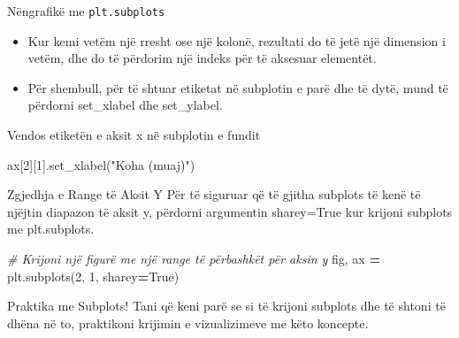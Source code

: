 \documentclass[
  ignorenonframetext,
]{beamer}
\newenvironment{Shaded}{\begin{snugshade}}{\end{snugshade}}
\newcommand{\CommentTok}[1]{\textcolor[rgb]{0.56,0.35,0.01}{\textit{#1}}}
\newcommand{\DecValTok}[1]{\textcolor[rgb]{0.00,0.00,0.81}{#1}}
\newcommand{\NormalTok}[1]{#1}
\newcommand{\OperatorTok}[1]{\textcolor[rgb]{0.81,0.36,0.00}{\textbf{#1}}}
\newcommand{\StringTok}[1]{\textcolor[rgb]{0.31,0.60,0.02}{#1}}
\newcommand{\VariableTok}[1]{\textcolor[rgb]{0.00,0.00,0.00}{#1}}
\begin{document}
\begin{frame}{Nëngrafikë me \texttt{plt.subplots}}
\protect\hypertarget{nuxebngrafikuxeb-me-plt.subplots-3}{}
\begin{itemize}
\item
  Kur kemi vetëm një rresht ose një kolonë, rezultati do të jetë një
  dimension i vetëm, dhe do të përdorim një indeks për të aksesuar
  elementët.
\item
  Për shembull, për të shtuar etiketat në subplotin e parë dhe të dytë,
  mund të përdorni set\_xlabel dhe set\_ylabel.
\end{itemize}
\end{frame}

\begin{frame}[fragile]{Vendos etiketën e aksit x në subplotin e fundit}
\protect\hypertarget{vendos-etiketuxebn-e-aksit-x-nuxeb-subplotin-e-fundit}{}

\begin{Shaded}
\begin{Highlighting}[]
\NormalTok{ax[}\DecValTok{2}\NormalTok{][}\DecValTok{1}\NormalTok{].set\_xlabel(}\StringTok{"Koha (muaj)"}\NormalTok{)}
\end{Highlighting}
\end{Shaded}
\end{frame}

\begin{frame}[fragile]{Zgjedhja e Range të Aksit Y}
\protect\hypertarget{zgjedhja-e-range-tuxeb-aksit-y}{}
Për të siguruar që të gjitha subplots të kenë të njëjtin diapazon të
aksit y, përdorni argumentin sharey=True kur krijoni subplots me
plt.subplots.


\begin{Shaded}
\begin{Highlighting}[]
\CommentTok{\# Krijoni një figurë me një range të përbashkët për aksin y}
\NormalTok{fig, ax }\OperatorTok{=}\NormalTok{ plt.subplots(}\DecValTok{2}\NormalTok{, }\DecValTok{1}\NormalTok{, sharey}\OperatorTok{=}\VariableTok{True}\NormalTok{)  }
\end{Highlighting}
\end{Shaded}
\end{frame}

\begin{frame}{Praktika me Subplots!}
\protect\hypertarget{praktika-me-subplots}{}
Tani që keni parë se si të krijoni subplots dhe të shtoni të dhëna në
to, praktikoni krijimin e vizualizimeve me këto koncepte.
\end{frame}
\end{document}
